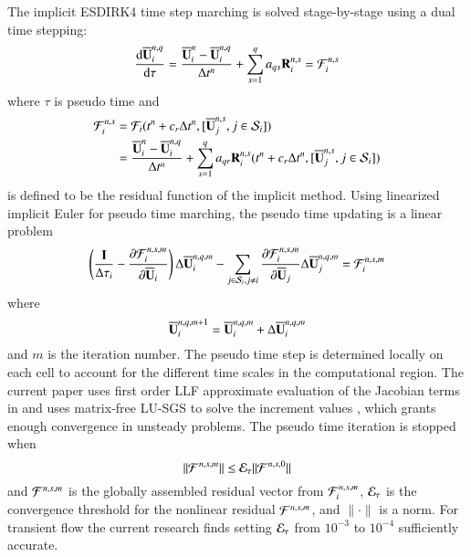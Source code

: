 \documentclass[preprint,12pt]{elsarticle}
\begin{document}
The implicit ESDIRK4 time step marching is solved stage-by-stage
using a dual time stepping:
\begin{equation}
    \derivative{\uu^{n,q}_i}{\tau} = \frac{\uu^{n}_i - \uu^{n,q}_i}{\inc t^n} + \sum_{s=1}^q a_{qs} \R^{n,s}_i = \FF_i^{n,s}
\end{equation}
where $\tau$ is pseudo time and
\begin{equation}
    \begin{aligned}
        \mathcal{F}_i^{n,s}
         & =
        \mathcal{F}_i(t^n + c_r\mathrm\Delta t^n, [\overline{\mathbf{U}}_j^{n,s}, j\in\mathcal{S}_i] ) \\
         & =
        \frac{\overline{\mathbf{U}}^{n}_i - \overline{\mathbf{U}}^{n,q}_i}{\mathrm\Delta t^n} +
        \sum_{s=1}^q a_{qr} \mathbf{R}^{n,s}_i( t^n + c_r\mathrm\Delta t^n, [\overline{\mathbf{U}}_j^{n,s}, j\in\mathcal{S}_i] )
    \end{aligned}
\end{equation}
is defined to be the residual function of the implicit method.
Using linearized implicit Euler for pseudo time marching,
the pseudo time updating is a linear problem
\begin{equation}
    \left(\frac{\eye}{\inc \tau_i}-\partialderivative{\FF_i^{n,s,m} }{\uu_i} \right) \inc \uu^{n,q, m}_i
    -
    \sum_{j\in\SAll_i,j\neq i} {
        \partialderivative{\FF_i^{n,s,m} }{\uu_j} \inc \uu^{n,q, m}_j
    }
    = \FF_i^{n,s,m}
    \label{eq:linearTauUpdate}
\end{equation}
where
\begin{equation}
    \overline{\mathbf{U}}^{n,q, m + 1}_i = \overline{\mathbf{U}}^{n,q, m}_i + \mathrm\Delta \overline{\mathbf{U}}^{n,q, m}_i
\end{equation}
and $m$ is the iteration number.
The pseudo time step is determined locally on each cell to account for
the different time scales in the computational region.
The current paper uses first order LLF approximate evaluation
of the Jacobian terms in  and uses matrix-free
LU-SGS to solve the increment values \cite{luo1998fast,luo2001accurate},
which grants enough convergence in unsteady problems. 
The pseudo time iteration is stopped when
\begin{equation}
    \|\FF^{n,s,m}\| \leq \varE_{\tau} \|\FF^{n,s,0}\|
\end{equation}
and $\mathcal{F}^{n,s,m}$ is the globally assembled residual vector from 
$\mathcal{F}^{n,s,m}_i$, $\varE_{\tau}$ is the convergence threshold for
the nonlinear residual $\mathcal{F}^{n,s,m}$, and $\|\cdot\|$ is 
a norm. For transient flow the current research finds setting $\varE_{\tau}$
from $10^{-3}$ to $10^{-4}$ sufficiently accurate.
\end{document}
